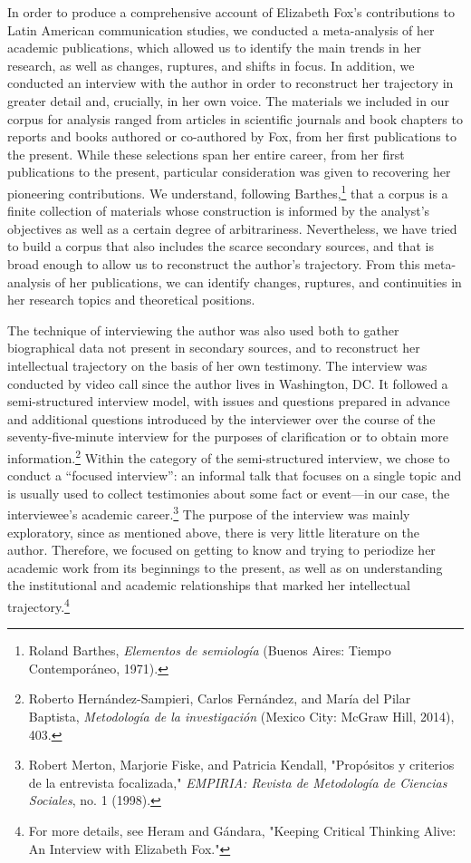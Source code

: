 \documentclass{tufte-handout}
\begin{document}
In order to produce a comprehensive account of Elizabeth Fox's
contributions to Latin American communication studies, we conducted a
meta-analysis of her academic publications, which allowed us to identify
the main trends in her research, as well as changes, ruptures, and
shifts in focus. In addition, we conducted an interview with the author
in order to reconstruct her trajectory in greater detail and, crucially,
in her own voice. The materials we included in our corpus for analysis
ranged from articles in scientific journals and book chapters to reports
and books authored or co-authored by Fox, from her first publications to
the present. While these selections span her entire career, from her
first publications to the present, particular consideration was given to
recovering her pioneering contributions. We understand, following
Barthes,\footnote{Roland Barthes, \emph{Elementos de semiología} (Buenos
  Aires: Tiempo Contemporáneo, 1971).} that a corpus is a finite
collection of materials whose construction is informed by the analyst's
objectives as well as a certain degree of arbitrariness. Nevertheless,
we have tried to build a corpus that also includes the scarce secondary
sources, and that is broad enough to allow us to reconstruct the
author's trajectory. From this meta-analysis of her publications, we can
identify changes, ruptures, and continuities in her research topics and
theoretical positions.

The technique of interviewing the author was also used both to gather
biographical data not present in secondary sources, and to reconstruct
her intellectual trajectory on the basis of her own testimony. The
interview was conducted by video call since the author lives in
Washington, DC. It followed a semi-structured interview model, with
issues and questions prepared in advance and additional questions
introduced by the interviewer over the course of the seventy-five-minute
interview for the purposes of clarification or to obtain more
information.\footnote{Roberto Hernández-Sampieri, Carlos Fernández, and
  María del Pilar Baptista, \emph{Metodología de la investigación}
  (Mexico City: McGraw Hill, 2014), 403.} Within the category of the
semi-structured interview, we chose to conduct a ``focused interview'':
an informal talk that focuses on a single topic and is usually used to
collect testimonies about some fact or event---in our case, the
interviewee's academic career.\footnote{Robert Merton, Marjorie Fiske,
  and Patricia Kendall, "Propósitos y criterios de la entrevista
  focalizada," \emph{EMPIRIA: Revista de Metodología de Ciencias
  Sociales}, no. 1 (1998).} The purpose of the interview was mainly
exploratory, since as mentioned above, there is very little literature
on the author. Therefore, we focused on getting to know and trying to
periodize her academic work from its beginnings to the present, as well
as on understanding the institutional and academic relationships that
marked her intellectual trajectory.\footnote{For more details, see Heram
  and Gándara, "Keeping Critical Thinking Alive: An Interview with
  Elizabeth Fox."}
\end{document}
